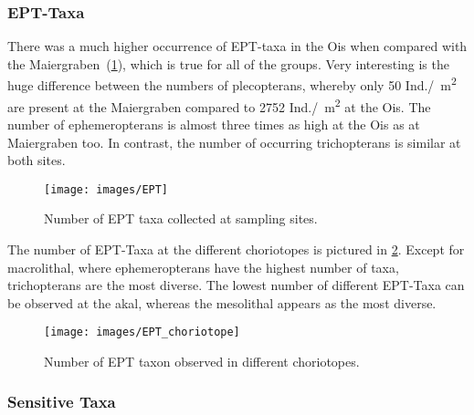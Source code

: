 \subsubsection{EPT-Taxa}\label{sec:ept_taxa_results}  %

There was a much higher occurrence of EPT-taxa in the Ois when compared with the Maiergraben~(\cref{fig:EPT}), which is true for all of the groups. Very interesting is the huge difference between the numbers of plecopterans, whereby only 50 Ind./\SI{}{\square\meter} are present at the Maiergraben compared to 2752 Ind./\SI{}{\square\meter} at the Ois. The number of ephemeropterans is almost three times as high at the Ois as at Maiergraben too. In contrast, the number of occurring trichopterans is similar at both sites.



\begin{figure}[!htb]                              %
  \center
  \texttt{[image: images/EPT]}                %
  \caption{Number of EPT taxa collected at sampling sites.}               %
  \label{fig:EPT}                                                       %
\end{figure}

The number of EPT-Taxa at the different choriotopes is pictured in \cref{fig:EPT_choriotope}. Except for macrolithal, where ephemeropterans have the highest number of taxa, trichopterans are the most diverse. The lowest number of different EPT-Taxa can be observed at the akal, whereas the mesolithal appears as the most diverse.

\begin{figure}[!htb]                              %
  \center
  \texttt{[image: images/EPT\_choriotope]}                %
  \caption{Number of EPT taxon observed in different choriotopes.}               %
  \label{fig:EPT_choriotope}                                                       %
\end{figure}




\subsubsection{Sensitive Taxa}\label{sec:sensitive_taxa_results}  %


